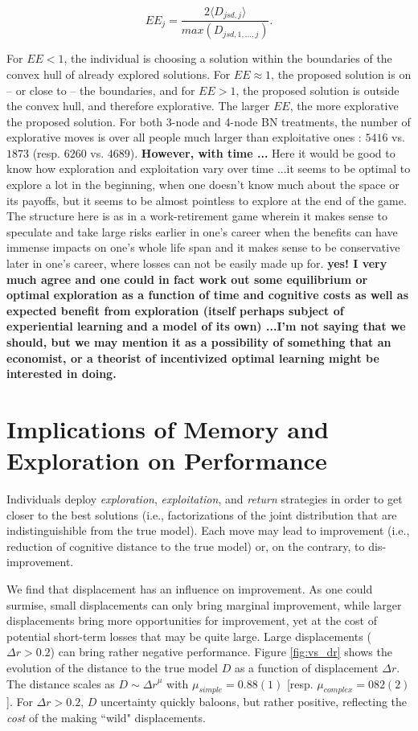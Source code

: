 \begin{equation}
EE_{j} = \frac{2 \langle D_{jsd,j} \rangle}{max(D_{jsd,1,...,j})}.
\end{equation}

For $EE < 1$, the individual is choosing a solution within the boundaries of the convex hull of already explored solutions. For $EE \approx 1$, the proposed solution is on -- or close to -- the boundaries, and for $EE > 1$, the proposed solution is outside the convex hull, and therefore explorative. The larger $EE$, the more explorative the proposed solution. For both 3-node and 4-node BN treatments,  the number of explorative moves is over all people much larger than exploitative ones :  $5416$ vs. $1873$ (resp. $6260$ vs. $4689$). {\bf However, with time ...} Here it would be good to know how exploration and exploitation vary over time ...it seems to be optimal to explore a lot in the beginning, when one doesn't know much about the space or its payoffs, but it seems to be almost pointless to explore at the end of the game. The structure here is as in a work-retirement game wherein it makes sense to speculate and take large risks earlier in one's career when the benefits can have immense impacts on one's whole life span and it makes sense to be conservative later in one's career, where losses can not be easily made up for.    
{\bf yes! I very much agree and one could in fact work out some equilibrium or optimal exploration as a function of time and cognitive costs as well as expected benefit from exploration (itself perhaps subject of experiential learning and a model of its own) ...I'm not saying that we should, but we may mention it as a possibility of something that an economist, or a theorist of incentivized optimal learning might be interested in doing. }

\section{Implications of Memory and Exploration on Performance}
Individuals deploy {\it exploration}, {\it exploitation}, and {\it return} strategies in order to get closer to the best solutions (i.e., factorizations of the joint distribution that are indistinguishible from the true model). Each move may lead to improvement (i.e., reduction of cognitive distance to the true model) or, on the contrary, to dis-improvement. 

We find that displacement has an influence on improvement. As one could surmise, small displacements can only bring marginal improvement, while larger displacements bring more opportunities for improvement, yet at the cost of potential short-term losses that may be quite large. Large displacements ($\Delta r > 0.2$) can bring rather negative performance. Figure \ref{fig:vs_dr} shows the evolution of the distance to the true model $D$ as a function of displacement $\Delta r$. The distance scales as $D \sim {\Delta r}^{\mu}$ with $\mu_{simple} = 0.88(1)$ [resp. $\mu_{complex} = 082(2)$]. For $\Delta r > 0.2$, $D$ uncertainty quickly baloons, but rather positive, reflecting the {\it cost} of the making ``wild" displacements. 

